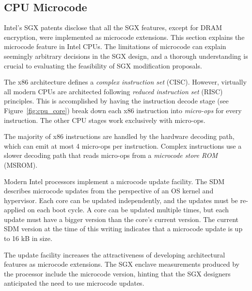 \subsection{CPU Microcode}
\label{sec:microcode}

Intel's SGX patents disclose that all the SGX features, except for DRAM
encryption, were implemented as microcode extensions. This section explains the
microcode feature in Intel CPUs. The limitations of microcode can explain
seemingly arbitrary decisions in the SGX design, and a thorough understanding
is crucial to evaluating the feasibility of SGX modification proposals.


The x86 architecture defines a \textit{complex instruction set} (CISC).
However, virtually all modern CPUs are architected following \textit{reduced
instruction set} (RISC) principles. This is accomplished by having the
instruction decode stage (see Figure~\ref{fig:cpu_core}) break down each x86
instruction into \textit{micro-ops} for every instruction. The other CPU stages
work exclusively with micro-ops.


The majority of x86 instructions are handled by the hardware decoding path,
which can emit at most 4 micro-ops per instruction. Complex instructions use a
slower decoding path that reads micro-ops from a \textit{microcode store ROM}
(MSROM).


Modern Intel processors implement a microcode update facility. The SDM
describes microcode updates from the perspective of an OS kernel and
hypervisor. Each core can be updated independently, and the updates must be
re-applied on each boot cycle. A core can be updated multiple times, but each
update must have a bigger version than the core's current version. The current
SDM version at the time of this writing indicates that a microcode update is
up to 16 kB in size.

The update facility increases the attractiveness of developing architectural
features as microcode extensions. The SGX enclave measurements produced by the
processor include the microcode version, hinting that the SGX designers
anticipated the need to use microcode updates.

